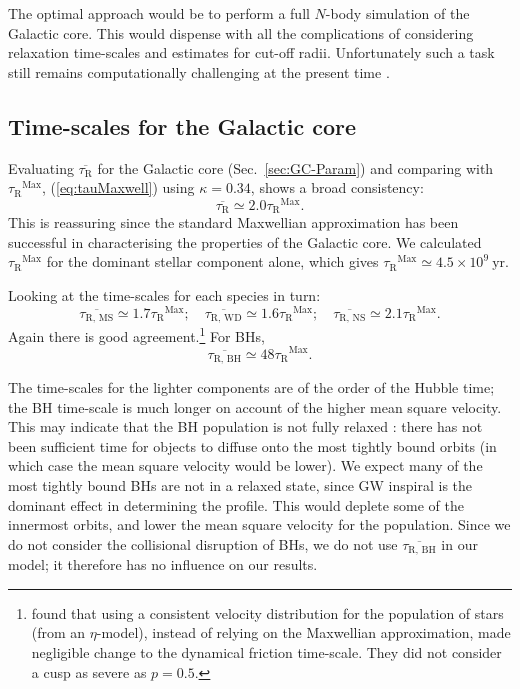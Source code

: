 \documentclass[useAMS,usedcolumn,usegraphicx,usenatbib]{mn2e}
\newcommand{\eqnref}[1]{(\ref{eq:#1})}
\newcommand{\secref}[1]{Sec.~\ref{sec:#1}}
\newcommand{\units}[1]{\ensuremath{~\mathrm{#1}}}
\newcommand{\sub}[1]{\ensuremath{_\mathrm{#1}}}
\newcommand{\super}[1]{\ensuremath{^\mathrm{#1}}}
\begin{document}
\begin{onecolumn}
The optimal approach would be to perform a full $N$-body simulation of the Galactic core. This would dispense with all the complications of considering relaxation time-scales and estimates for cut-off radii. Unfortunately such a task still remains computationally challenging at the present time \citep[e.g.,][]{Li2012}.

\subsection{Time-scales for the Galactic core}\label{sec:tauGC}

Evaluating $\overline{\tau\sub{R}}$ for the Galactic core (\secref{GC-Param}) and comparing with $\tau\sub{R}\super{Max}$, \eqnref{tauMaxwell} using $\kappa = 0.34$, shows a broad consistency:
\begin{equation}
\overline{\tau\sub{R}} \simeq 2.0 \tau\sub{R}\super{Max}.
\end{equation}
This is reassuring since the standard Maxwellian approximation has been successful in characterising the properties of the Galactic core. We calculated $\tau\sub{R}\super{Max}$ for the dominant stellar component alone, which gives $\tau\sub{R}\super{Max}\simeq 4.5 \times 10^9\units{yr}$.

Looking at the time-scales for each species in turn:
\begin{equation}
\overline{\tau\sub{R,\,MS}} \simeq 1.7 \tau\sub{R}\super{Max};\quad \overline{\tau\sub{R,\,WD}} \simeq 1.6 \tau\sub{R}\super{Max};\quad \overline{\tau\sub{R,\,NS}} \simeq 2.1 \tau\sub{R}\super{Max}.
\end{equation}
Again there is good agreement.\footnote{\citet*{Freitag2006} found that using a consistent velocity distribution for the population of stars (from an $\eta$-model), instead of relying on the Maxwellian approximation, made negligible change to the dynamical friction time-scale. They did not consider a cusp as severe as $p = 0.5$.} For BHs,
\begin{equation}
\overline{\tau\sub{R,\,BH}} \simeq 48 \tau\sub{R}\super{Max}.
\end{equation}

The time-scales for the lighter components are of the order of the Hubble time; the BH time-scale is much longer on account of the higher mean square velocity. This may indicate that the BH population is not fully relaxed \citep[cf.][]{Antonini2011}: there has not been sufficient time for objects to diffuse onto the most tightly bound orbits (in which case the mean square velocity would be lower). We expect many of the most tightly bound BHs are not in a relaxed state, since GW inspiral is the dominant effect in determining the profile. This would deplete some of the innermost orbits, and lower the mean square velocity for the population. Since we do not consider the collisional disruption of BHs, we do not use $\overline{\tau\sub{R,\,BH}}$ in our model; it therefore has no influence on our results.


\end{onecolumn}
\end{document}
